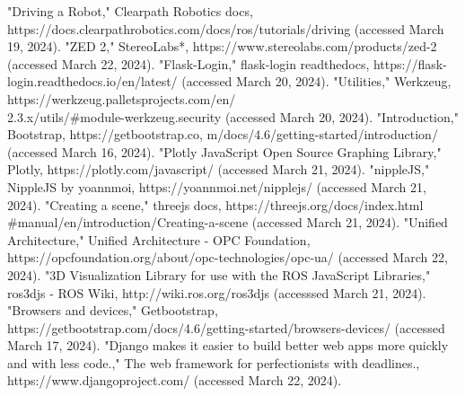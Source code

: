 \documentclass[conference]{IEEEtran}
\begin{document}
\begin{thebibliography}{00}
"Driving a Robot," Clearpath Robotics docs, https://docs.clearpathrobotics.com/docs/ros/tutorials/driving (accessed March 19, 2024).
"ZED 2," StereoLabs*, https://www.stereolabs.com/products/zed-2 (accessed March 22, 2024).
"Flask-Login," flask-login readthedocs, https://flask-login.readthedocs.io/en/latest/ (accessed March 20, 2024).
"Utilities," Werkzeug, https://werkzeug.palletsprojects.com/en/\\2.3.x/utils/\#module-werkzeug.security (accessed March 20, 2024).
"Introduction," Bootstrap, https://getbootstrap.co, m/docs/4.6/getting-started/introduction/ (accessed March 16, 2024).
"Plotly JavaScript Open Source Graphing Library," Plotly, https://plotly.com/javascript/ (accessed March 21, 2024).
"nippleJS," NippleJS by yoannmoi, https://yoannmoi.net/nipplejs/ (accessed March 21, 2024).
"Creating a scene," threejs docs, https://threejs.org/docs/index.html\\\#manual/en/introduction/Creating-a-scene (accessed March 21, 2024).
"Unified Architecture," Unified Architecture - OPC Foundation, https://opcfoundation.org/about/opc-technologies/opc-ua/ (accessed March 22, 2024).
"3D Visualization Library for use with the ROS JavaScript Libraries," ros3djs - ROS Wiki, http://wiki.ros.org/ros3djs (accesssed March 21, 2024).
"Browsers and devices," Getbootstrap, https://getbootstrap.com/docs/4.6/getting-started/browsers-devices/ (accessed March 17, 2024).
"Django makes it easier to build better web apps more quickly and with less code.," The web framework for perfectionists with deadlines., https://www.djangoproject.com/ (accessed March 22, 2024).
\end{thebibliography}
\vspace{12pt}
\end{document}
